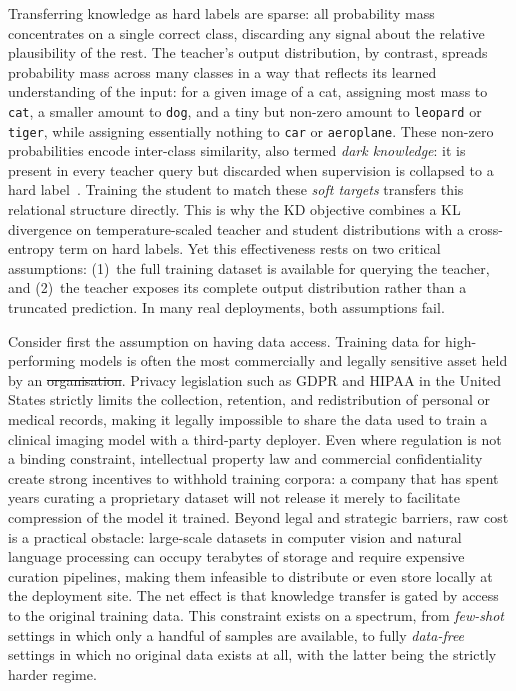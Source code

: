 \documentclass[12pt, a4paper, twoside]{book}
\makeatletter
\numberwithin{equation}{chapter}
\theoremstyle{plain}
\theoremstyle{definition}
\theoremstyle{remark}
\newenvironment{foldable}{}{}
\providecommand{\DIFaddtex}[1]{{\protect\color{blue}\uwave{#1}}} %
\providecommand{\DIFdeltex}[1]{{\protect\color{red}\sout{#1}}} %
\providecommand{\DIFaddbegin}{} %
\providecommand{\DIFaddend}{} %
\providecommand{\DIFdelbegin}{} %
\providecommand{\DIFdelend}{} %
\providecommand{\DIFadd}[1]{\texorpdfstring{\DIFaddtex{#1}}{#1}} %
\providecommand{\DIFdel}[1]{\texorpdfstring{\DIFdeltex{#1}}{}} %
\newcommand{\DIFscaledelfig}{0.5}
\newlength{\DIFdelgraphicswidth} %
\newlength{\DIFdelgraphicsheight} %
\newcommand{\DIFaddincludegraphics}[2][]{{\color{blue}\fbox{\DIFOincludegraphics[#1]{#2}}}} %
\newcommand{\DIFdelincludegraphics}[2][]{%
\sbox{\DIFdelgraphicsbox}{\DIFOincludegraphics[#1]{#2}}%
\settoboxwidth{\DIFdelgraphicswidth}{\DIFdelgraphicsbox} %
\settoboxtotalheight{\DIFdelgraphicsheight}{\DIFdelgraphicsbox} %
\scalebox{\DIFscaledelfig}{%
\parbox[b]{\DIFdelgraphicswidth}{\usebox{\DIFdelgraphicsbox}\\[-\baselineskip] \rule{\DIFdelgraphicswidth}{0em}}\llap{\resizebox{\DIFdelgraphicswidth}{\DIFdelgraphicsheight}{%
\setlength{\unitlength}{\DIFdelgraphicswidth}%
\begin{picture}(1,1)%
\thicklines\linethickness{2pt} %
{\color[rgb]{1,0,0}\put(0,0){\framebox(1,1){}}}%
{\color[rgb]{1,0,0}\put(0,0){\line( 1,1){1}}}%
{\color[rgb]{1,0,0}\put(0,1){\line(1,-1){1}}}%
\end{picture}%
}\hspace*{3pt}}} %
} %
\DeclareRobustCommand{\DIFaddbegin}{\DIFOaddbegin \let\includegraphics\DIFaddincludegraphics} %
\DeclareRobustCommand{\DIFaddend}{\DIFOaddend \let\includegraphics\DIFOincludegraphics} %
\DeclareRobustCommand{\DIFdelbegin}{\DIFOdelbegin \let\includegraphics\DIFdelincludegraphics} %
\DeclareRobustCommand{\DIFdelend}{\DIFOaddend \let\includegraphics\DIFOincludegraphics} %
\let\sout@orig\sout %
\renewcommand{\sout}[1]{\ifmmode\text{\sout@orig{\ensuremath{#1}}}\else\sout@orig{#1}\fi} %
\makeatother
\begin{document}
\begin{foldable}
  Transferring knowledge as hard labels are sparse: all probability mass concentrates on a single correct class, discarding any signal about the relative plausibility of the rest.
  The teacher's output distribution, by contrast, spreads probability mass across many classes in a way that reflects its learned understanding of the input: for a given image of a cat, assigning most mass to \texttt{cat}, a smaller amount to \texttt{dog}, and a tiny but non-zero amount to \texttt{leopard} or \texttt{tiger}, while assigning essentially nothing to \texttt{car} or \texttt{aeroplane}.
  These non-zero probabilities encode inter-class similarity, also termed \textit{dark knowledge}: it is present in every teacher query but discarded when supervision is collapsed to a hard label~\cite{hinton2015distilling}.
  Training the student to match these \textit{soft targets} transfers this relational structure directly.
  This is why the \ac{KD} objective combines a \ac{KL} divergence on temperature-scaled teacher and student distributions with a cross-entropy term on hard labels.
  Yet this effectiveness rests on two critical assumptions: (1)~the full training dataset is available for querying the teacher, and (2)~the teacher exposes its complete output distribution rather than a truncated prediction.
  In many real deployments, both assumptions fail.
\end{foldable}

\begin{foldable}
  Consider first the assumption on having data access.
  Training data for high-performing models is often the most commercially and legally sensitive asset held by an \DIFdelbegin \DIFdel{organisation}\DIFdelend \DIFaddbegin \DIFadd{organization}\DIFaddend .
  Privacy legislation such as \ac{GDPR}\cite{eu2016gdpr} and \ac{HIPAA}\cite{us1996hipaa} in the United States strictly limits the collection, retention, and redistribution of personal or medical records, making it legally impossible to share the data used to train a clinical imaging model with a third-party deployer.
  Even where regulation is not a binding constraint, intellectual property law and commercial confidentiality create strong incentives to withhold training corpora: a company that has spent years curating a proprietary dataset will not release it merely to facilitate compression of the model it trained.
  Beyond legal and strategic barriers, raw cost is a practical obstacle: large-scale datasets in computer vision and natural language processing can occupy terabytes of storage and require expensive curation pipelines, making them infeasible to distribute or even store locally at the deployment site.
  The net effect is that knowledge transfer is gated by access to the original training data.
  This constraint exists on a spectrum, from \textit{few-shot} settings in which only a handful of samples are available, to fully \textit{data-free} settings in which no original data exists at all, with the latter being the strictly harder regime.
\end{foldable}
\end{document}
